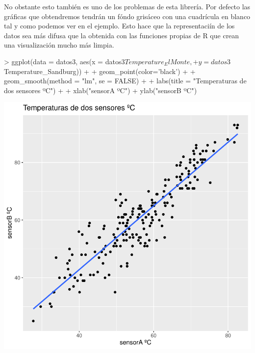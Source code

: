 \documentclass [a4paper] {article}
\begin{document}
No obstante esto también es uno de los problemas de esta librería.
Por defecto las gráficas que obtendremos tendrán un fóndo grisáceo con una cuadrícula en blanco tal y como podemos ver en el ejemplo.
Esto hace que la representaciín de los datos sea más difusa que la obtenida con las funciones propias de R que crean una visualización mucho más limpia.
\begin{center}
\begin{Schunk}
\begin{Sinput}
> ggplot(data = datos3, aes(x = datos3$Temperature_ElMonte, 
+                           y = datos3$Temperature_Sandburg)) + 
+   geom_point(color='black') +
+   geom_smooth(method = "lm", se = FALSE) + 
+   labs(title = "Temperaturas de dos sensores ºC") +
+   xlab("sensorA ºC") + ylab("sensorB ºC")
\end{Sinput}
\end{Schunk}
\includegraphics{entrega-ggplot2_NO_se}
\end{center}
\end{document}
